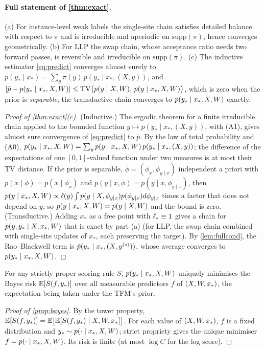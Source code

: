 \paragraph{Full statement of \cref{thm:exact}.} (a) For instance-level weak labels the single-site chain satisfies detailed
balance with respect to $\pi$ and is irreducible and aperiodic on $\mathrm{supp}(\pi)$, hence converges geometrically.
(b) For LLP the swap chain, whose acceptance ratio needs two forward passes, is reversible and irreducible on
$\mathrm{supp}(\pi)$. (c) The inductive estimator \eqref{eq:predict} converges almost surely to
$\bar p(y_*\mid x_*)=\sum_y\pi(y)\,p(y_*\mid x_*,(X,y))$, and
$\lvert\bar p-p(y_*\mid x_*,X,W)\rvert\le\mathrm{TV}\big(p(y\mid X,W),\,p(y\mid x_*,X,W)\big)$, which is zero when the prior is
\emph{separable}; the transductive chain converges to $p(y_*\mid x_*,X,W)$ exactly.
\begin{proof}[Proof of \cref{thm:exact}(c)]
(Inductive.) The ergodic theorem for a finite irreducible chain applied to the bounded function
$y\mapsto p(y_*\mid x_*,(X,y))$, with (A1), gives almost sure convergence of \eqref{eq:predict} to $\bar p$.
By the law of total probability and (A0), $p(y_*\mid x_*,X,W)=\sum_yp(y\mid x_*,X,W)\,p(y_*\mid x_*,(X,y))$; the
difference of the expectations of one $[0,1]$-valued function under two measures is at most their TV distance.
If the prior is separable, $\phi=(\phi_x,\phi_{y\mid x})$ independent a priori with $p(x\mid\phi)=p(x\mid\phi_x)$ and
$p(y\mid x,\phi)=p(y\mid x,\phi_{y\mid x})$, then $p(y\mid x_*,X,W)\propto\ell(y)\int p(y\mid X,\phi_{y\mid x})p(\phi_{y\mid x})d\phi_{y\mid x}$
times a factor that does not depend on $y$, so $p(y\mid x_*,X,W)=p(y\mid X,W)$ and the bound is zero.
(Transductive.) Adding $x_*$ as a free point with $\ell_*\equiv1$ gives a chain for $p(y,y_*\mid X,x_*,W)$ that is exact by
part (a) (for LLP, the swap chain combined with single-site updates of $x_*$, each preserving the target). By
\cref{lem:fullcond}, the Rao--Blackwell term is $\tilde p(y_*\mid x_*,(X,y^{(s)}))$, whose average converges to
$p(y_*\mid x_*,X,W)$.
\end{proof}

\begin{proposition}\label{prop:bayes}
For any strictly proper scoring rule $S$, $p(y_*\mid x_*,X,W)$ uniquely minimises the Bayes risk $\mathbb{E}[S(f,y_*)]$ over all
measurable predictors $f$ of $(X,W,x_*)$, the expectation being taken under the TFM's prior.
\end{proposition}
\begin{proof}[Proof of \cref{prop:bayes}]
By the tower property, $\mathbb{E}[S(f,y_*)]=\mathbb{E}\big[\mathbb{E}[S(f,y_*)\mid X,W,x_*]\big]$. For each value of $(X,W,x_*)$, $f$ is a fixed
distribution and $y_*\sim p(\cdot\mid x_*,X,W)$; strict propriety gives the unique minimiser
$f=p(\cdot\mid x_*,X,W)$. Its risk is finite (at most $\log C$ for the log score).
\end{proof}

